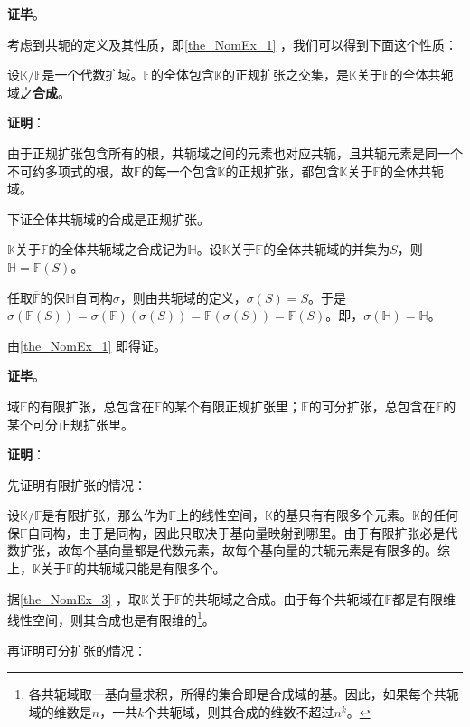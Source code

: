 \textbf{证毕}。


考虑到共轭的定义及其性质，即\autoref{the_NomEx_1} ，我们可以得到下面这个性质：

\begin{theorem}{}\label{the_NomEx_3}
设$\mathbb{K}/\mathbb{F}$是一个代数扩域。$\mathbb{F}$的全体包含$\mathbb{K}$的正规扩张之交集，是$\mathbb{K}$关于$\mathbb{F}$的全体共轭域之\textbf{合成}。
\end{theorem}

\textbf{证明}：

由于正规扩张包含所有的根，共轭域之间的元素也对应共轭，且共轭元素是同一个不可约多项式的根，故$\mathbb{F}$的每一个包含$\mathbb{K}$的正规扩张，都包含$\mathbb{K}$关于$\mathbb{F}$的全体共轭域。

下证全体共轭域的合成是正规扩张。

$\mathbb{K}$关于$\mathbb{F}$的全体共轭域之合成记为$\mathbb{H}$。设$\mathbb{K}$关于$\mathbb{F}$的全体共轭域的并集为$S$，则$\mathbb{H}=\mathbb{F}(S)$。

任取$\overline{\mathbb{F}}$的保$\mathbb{H}$自同构$\sigma$，则由共轭域的定义，$\sigma(S)=S$。于是$\sigma(\mathbb{F}(S))=\sigma(\mathbb{F})(\sigma(S))=\mathbb{F}(\sigma(S))=\mathbb{F}(S)$。即，$\sigma(\mathbb{H})=\mathbb{H}$。

由\autoref{the_NomEx_1} 即得证。

\textbf{证毕}。


\begin{theorem}{}\label{the_NomEx_4}
域$\mathbb{F}$的有限扩张，总包含在$\mathbb{F}$的某个有限正规扩张里；$\mathbb{F}$的可分扩张，总包含在$\mathbb{F}$的某个可分正规扩张里。
\end{theorem}

\textbf{证明}：

先证明有限扩张的情况：

设$\mathbb{K}/\mathbb{F}$是有限扩张，那么作为$\mathbb{F}$上的线性空间，$\mathbb{K}$的基只有有限多个元素。$\mathbb{K}$的任何保$\mathbb{F}$自同构，由于是同构，因此只取决于基向量映射到哪里。由于有限扩张必是代数扩张，故每个基向量都是代数元素，故每个基向量的共轭元素是有限多的。综上，$\mathbb{K}$关于$\mathbb{F}$的共轭域只能是有限多个。

据\autoref{the_NomEx_3} ，取$\mathbb{K}$关于$\mathbb{F}$的共轭域之合成。由于每个共轭域在$\mathbb{F}$都是有限维线性空间，则其合成也是有限维的\footnote{各共轭域取一基向量求积，所得的集合即是合成域的基。因此，如果每个共轭域的维数是$n$，一共$k$个共轭域，则其合成的维数不超过$n^k$。}。

再证明可分扩张的情况：

